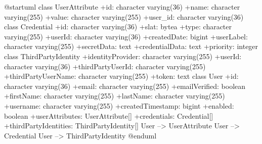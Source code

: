 \begin{plantuml}

@startuml
class UserAttribute {
    +id: character varying(36)
    +name: character varying(255)
    +value: character varying(255)
    +user_id: character varying(36)
}
class Credential {
    +id: character varying(36)
    +slat: bytea
    +type: character varying(255)
    +userId: character varying(36)
    +createdDate: bigint
    +userLabel: character varying(255)
    +secretData: text
    +credentialData: text
    +priority: integer
}
class ThirdPartyIdentity {
    +identityProvider: character varying(255)
    +userId: character varying(36)
    +thirdPartyUserId: character varying(255)
    +thirdPartyUserName: character varying(255)
    +token: text
}
class User {
    +id: character varying(36)
    +email: character varying(255)
    +emailVerified: boolean
    +firstName: character varying(255)
    +lastName: character varying(255)
    +username: character varying(255)
    +createdTimestamp: bigint
    +enabled: boolean
    +userAttributes: UserAttribute[]
    +credentials: Credential[]
    +thirdPartyIdentities: ThirdPartyIdentity[]
}
User --> UserAttribute
User --> Credential
User --> ThirdPartyIdentity
@enduml

\end{plantuml}

